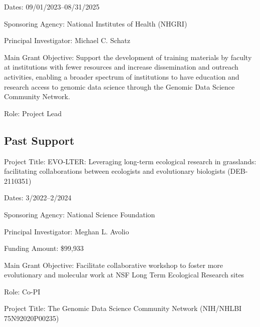 \documentclass{cv}
\begin{document}
Dates: 09/01/2023--08/31/2025

Sponsoring Agency: National Institutes of Health (NHGRI)

Principal Investigator: Michael C. Schatz

Main Grant Objective: Support the development of training materials by faculty at institutions with fewer resources and increase dissemination and outreach activities, enabling a broader spectrum of institutions to have education and research access to genomic data science through the Genomic Data Science Community Network.

Role: Project Lead

%
%
%
%
%
%

\subsection*{Past Support}

Project Title: EVO-LTER: Leveraging long-term ecological research in grasslands: facilitating collaborations between ecologists and evolutionary biologists (DEB-2110351)

Dates: 3/2022--2/2024

Sponsoring Agency: National Science Foundation

Principal Investigator: Meghan L. Avolio

Funding Amount: \$99,933

Main Grant Objective: Facilitate collaborative workshop to foster more evolutionary and molecular work at NSF Long Term Ecological Research sites

Role: Co-PI

\vspace{5mm}

Project Title: The Genomic Data Science Community Network (NIH/NHLBI 75N92020P00235)
\end{document}
